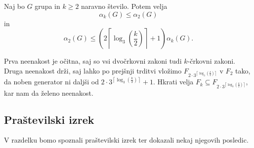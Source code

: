 \begin{posledica}\label{psl_veccrkovni_zakoni_meje}
Naj bo $G$ grupa in $k \ge 2$ naravno število. Potem velja \begin{equation*}
     \alpha_k(G) \le  \alpha_2(G) 
\end{equation*}  
in \begin{equation*}
\alpha_2(G) \le \left( {2 \left\lceil \log_3 \left(\frac{k}{2} \right) \right\rceil + 1  } \right) \alpha_k(G).
\end{equation*}  
\end{posledica}
\begin{dokaz}
    Prva neenakost je očitna, saj so vsi dvočrkovni zakoni tudi $k$-črkovni zakoni. Druga neenakost drži, saj lahko po prejšnji trditvi vložimo $F_{2 \cdot  3^{\left\lceil \log_3 \left(\frac{k}{2} \right) \right\rceil}}$ v $F_2$
    tako, da noben generator ni daljši od ${2 \cdot  3^{\left\lceil \log_3 \left(\frac{k}{2} \right) \right\rceil } + 1 }$. Hkrati velja $F_k \subseteq F_{2 \cdot  3^{\left\lceil \log_3 \left(\frac{k}{2} \right)  \right\rceil}}$, kar nam da želeno neenakost.
\end{dokaz}

\subsection{Praštevilski izrek}

V razdelku bomo spoznali praštevilski izrek ter dokazali nekaj njegovih posledic.




